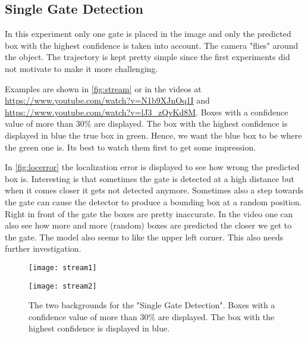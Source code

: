 \documentclass{article}
\begin{document}
\subsection{Single Gate Detection} 
In this experiment only one gate is placed in the image and only the predicted box with the highest confidence is taken into account. The camera "flies" around the object. The trajectory is kept pretty simple since the first experiments did not motivate to make it more challenging.

Examples are shown in \autoref{fig:stream} or in the videos at \url{https://www.youtube.com/watch?v=N1b9XJnOq1I} and \url{https://www.youtube.com/watch?v=lJ3_zQvKd8M}. Boxes with a confidence value of more than 30\% are displayed. The box with the highest confidence is displayed in blue the true box in green. Hence, we want the blue box to be where the green one is. Its best to watch them first to get some impression.

In \autoref{fig:locerror} the localization error is displayed to see how wrong the predicted box is. Interesting is that sometimes the gate is detected at a high distance but when it comes closer it gets not detected anymore. Sometimes also a step towards the gate can cause the detector to produce a bounding box at a random position. Right in front of the gate the boxes are pretty inaccurate. In the video one can also see how more and more (random) boxes are predicted the closer we get to the gate. The model also seems to like the upper left corner. This also needs further investigation.

\begin{figure}[h]
	\centering
	\begin{minipage}{0.25\textwidth}
		\centering
		\texttt{[image: stream1]}
			
	\end{minipage}
	\begin{minipage}{0.25\textwidth}
		\centering
		\texttt{[image: stream2]}
	\end{minipage}
	\caption{The two backgrounds for the "Single Gate Detection". Boxes with a confidence value of more than 30\% are displayed. The box with the highest confidence is displayed in blue.}
	\label{fig:stream}
\end{figure}
\end{document}
